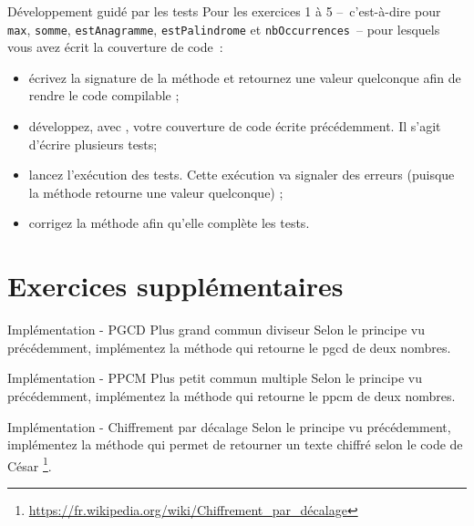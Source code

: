 \documentclass[a4paper,11pt]{style-esi/td}
\begin{document}
\begin{Exercice}{Développement guidé par les tests}
	Pour les exercices 1 à 5 
	--~c'est-à-dire pour 
	\texttt{max}, \texttt{somme}, \texttt{estAnagramme}, 
	\texttt{estPalindrome} et \texttt{nbOccurrences}~--
	pour lesquels vous avez écrit la couverture de code~:
	\begin{itemize}
		\item écrivez la signature de la méthode 
			et retournez une valeur quelconque afin de rendre le code compilable ;
		\item développez, avec , 
			votre couverture de code écrite précédemment. 
			Il s'agit d'écrire plusieurs tests;
		\item lancez l'exécution des tests. 
			Cette exécution va signaler des erreurs 
			(puisque la méthode retourne une valeur quelconque) ;
		\item corrigez la méthode afin qu'elle complète les tests.
	\end{itemize}
\end{Exercice}

\section{Exercices supplémentaires}

\begin{Exercice}{Implémentation - PGCD Plus grand commun diviseur}
	Selon le principe vu précédemment, 
	implémentez la méthode  
	qui retourne le pgcd de deux nombres.
\end{Exercice}

\begin{Exercice}{Implémentation - PPCM Plus petit commun multiple}
	Selon le principe vu précédemment, 
	implémentez la méthode  
	qui retourne le ppcm de deux nombres.
\end{Exercice}

\begin{Exercice}{Implémentation - Chiffrement par décalage}
	Selon le principe vu précédemment, 
	implémentez la méthode  
	qui permet de retourner un texte chiffré selon le code de César%
	\footnote{%
		\url{https://fr.wikipedia.org/wiki/Chiffrement_par_décalage}
	}.
\end{Exercice}
\end{document}
